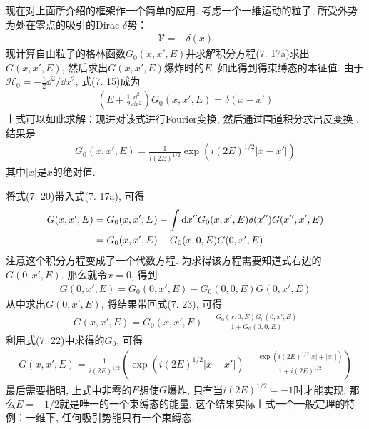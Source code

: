 现在对上面所介绍的框架作一个简单的应用. 
考虑一个一维运动的粒子, 
所受外势为处在零点的吸引的Dirac $\delta$势：
\begin{align}
\mathscr{V} = -\delta(x)
\end{align}
现计算自由粒子的格林函数$G_0(x,x',E)$并求解积分方程(7.
17a)求出$G(x,x',E)$, 
然后求出$G(x,x',E)$爆炸时的$E$, 
如此得到得束缚态的本征值. 
由于$\mathscr{H}_0 = -\frac{1}{2}\dd^2/\dd x^2$, 
式(7.
15)成为
\begin{align}
\left( E + \frac{1}{2}\frac{\dd^2}{\dd x^2} \right) G_0(x,x',E) = \delta(x-x')
\end{align}
上式可以如此求解：现进对该式进行Fourier变换, 
然后通过围道积分求出反变换
. 结果是
\begin{align}
G_0(x,x',E) = \frac{1}{i(2E)^{1/2}}\exp(i(2E)^{1/2}|x-x'|)
\end{align}
其中$|x|$是$x$的绝对值.


将式(7.
20)带入式(7.
17a), 
可得
\begin{align}
G(x,x',E) & = G_0(x,x',E) - \int\dd x''G_0(x,x',E)\delta(x'')G(x'',x',E)\notag\\
          & = G_0(x,x',E) - G_0(x,0,E)G(0,x',E)
\end{align}
注意这个积分方程变成了一个代数方程. 
为求得该方程需要知道式右边的$G(0,x',E)$. 
那么就令$x=0$, 
得到
\begin{align}
G(0,x',E) = G_0(0,x',E) - G_0(0,0,E)G(0,x',E)
\end{align}
从中求出$G(0,x',E)$, 
将结果带回式(7.
23), 
可得
\begin{align}
G(x,x',E) = G_0(x,x',E) - \frac{G_0(x,0,E) G_0(0,x',E)}{1 + G_0(0,0,E)}
\end{align}
利用式(7.
22)中求得的$G_0$, 
可得
\begin{align}
G(x,x',E) = \frac{1}{i(2E)^{1/2}} \left( \exp(i(2E)^{1/2}|x-x'|) - \frac{\exp(i(2E)^{1/2}|x|+|x;|)}{1+i(2E)^{1/2}} \right)
\end{align}
最后需要指明, 
上式中非零的$E$想使$G$爆炸, 
只有当$i(2E)^{1/2}=-1$时才能实现, 
那么$E=-1/2$就是唯一的一个束缚态的能量. 
这个结果实际上式一个一般定理的特例：一维下, 
任何吸引势能只有一个束缚态.

